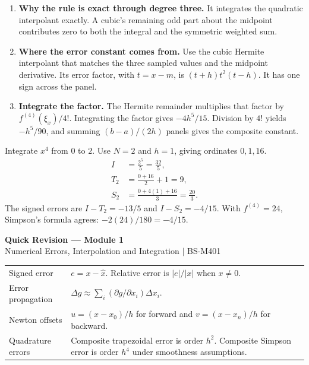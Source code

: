 \documentclass[12pt,a4paper]{article}
\renewcommand{\arraystretch}{1.45}
\begin{document}
\begin{enumerate}[leftmargin=*, itemsep=3pt, topsep=4pt]
  \item \textbf{Why the rule is exact through degree three.} It integrates the quadratic interpolant exactly. A cubic's remaining odd part about the midpoint contributes zero to both the integral and the symmetric weighted sum.
  \item \textbf{Where the error constant comes from.} Use the cubic Hermite interpolant that matches the three sampled values and the midpoint derivative. Its error factor, with $t=x-m$, is $(t+h)t^2(t-h)$. It has one sign across the panel.
  \item \textbf{Integrate the factor.} The Hermite remainder multiplies that factor by $f^{(4)}(\xi_x)/4!$. Integrating the factor gives $-4h^5/15$. Division by $4!$ yields $-h^5/90$, and summing $(b-a)/(2h)$ panels gives the composite constant.
\end{enumerate}
\begin{tcolorbox}[examplebox, title={Compare rules and their signed errors on the same data}]
Integrate $x^4$ from $0$ to $2$. Use $N=2$ and $h=1$, giving ordinates $0,1,16$.
\[
\begin{aligned}
I&=\frac{2^5}{5}=\frac{32}{5},\\
T_2&=\frac{0+16}{2}+1=9,\\
S_2&=\frac{0+4(1)+16}{3}=\frac{20}{3}.
\end{aligned}
\]
The signed errors are $I-T_2=-13/5$ and $I-S_2=-4/15$. With $f^{(4)}=24$, Simpson's formula agrees: $-2(24)/180=-4/15$.
\end{tcolorbox}

\newpage
\begin{center}
  {\large\bfseries\color{myred} Quick Revision --- Module 1}\\[3pt]
  {\small\color{mydark} Numerical Errors, Interpolation and Integration $|$ BS-M401}
\end{center}
\noindent{\color{myred}\rule{\linewidth}{1.2pt}}\par\vspace{4pt}

\begin{tcolorbox}[formulabox, title={Key Concepts at a Glance}]
\renewcommand{\arraystretch}{1.35}
\noindent\begin{tabularx}{\linewidth}{B{4.5cm}Y}
Signed error & $e=x-\hat x$. Relative error is $|e|/|x|$ when $x\ne0$. \\[3pt]
Error propagation & $\Delta g\approx\sum_i(\partial g/\partial x_i)\Delta x_i$. \\[3pt]
Newton offsets & $u=(x-x_0)/h$ for forward and $v=(x-x_n)/h$ for backward. \\[3pt]
Quadrature errors & Composite trapezoidal error is order $h^2$. Composite Simpson error is order $h^4$ under smoothness assumptions. \\[3pt]
\end{tabularx}\par
\end{tcolorbox}
\end{document}
